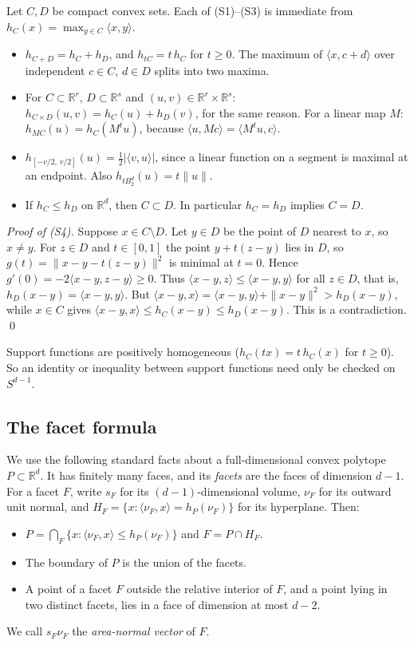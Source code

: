 \documentclass[11pt]{article}
\newcommand{\R}{\mathbb R}
\begin{document}
Let \(C,D\) be compact convex sets. Each of (S1)--(S3) is immediate from
\(h_C(x)=\max_{y\in C}\langle x,y\rangle\).
\begin{itemize}[leftmargin=3em,itemsep=2pt]
\item[(S1)] \(h_{C+D}=h_C+h_D\), and \(h_{tC}=t\,h_C\) for \(t\ge0\).
 The maximum of \(\langle x,c+d\rangle\) over independent \(c\in C\),
 \(d\in D\) splits into two maxima.
\item[(S2)] For \(C\subset\R^r\), \(D\subset\R^s\) and
 \((u,v)\in\R^r\times\R^s\): \(h_{C\times D}(u,v)=h_C(u)+h_D(v)\), for the
 same reason. For a linear map \(M\): \(h_{MC}(u)=h_C(M^tu)\), because
 \(\langle u,Mc\rangle=\langle M^tu,c\rangle\).
\item[(S3)] \(h_{[-v/2,\,v/2]}(u)=\tfrac12|\langle v,u\rangle|\), since a
 linear function on a segment is maximal at an endpoint. Also
 \(h_{tB_2^d}(u)=t\|u\|\).
\item[(S4)] If \(h_C\le h_D\) on \(\R^d\), then \(C\subset D\). In
 particular \(h_C=h_D\) implies \(C=D\).
\end{itemize}
\emph{Proof of (S4).} Suppose \(x\in C\setminus D\). Let \(y\in D\) be the
point of \(D\) nearest to \(x\), so \(x\ne y\). For \(z\in D\) and
\(t\in[0,1]\) the point \(y+t(z-y)\) lies in \(D\), so
\(g(t)=\|x-y-t(z-y)\|^2\) is minimal at \(t=0\). Hence
\(g'(0)=-2\langle x-y,z-y\rangle\ge0\). Thus
\(\langle x-y,z\rangle\le\langle x-y,y\rangle\) for all \(z\in D\), that
is, \(h_D(x-y)=\langle x-y,y\rangle\). But
\(\langle x-y,x\rangle=\langle x-y,y\rangle+\|x-y\|^2>h_D(x-y)\), while
\(x\in C\) gives \(\langle x-y,x\rangle\le h_C(x-y)\le h_D(x-y)\). This is
a contradiction. \qed

\smallskip
Support functions are positively homogeneous (\(h_C(tx)=t\,h_C(x)\) for
\(t\ge0\)). So an identity or inequality between support functions need
only be checked on \(S^{d-1}\).

\subsection{The facet formula}

We use the following standard facts about a full-dimensional convex
polytope \(P\subset\R^d\). It has finitely many faces, and its
\emph{facets} are the faces of dimension \(d-1\). For a facet \(F\), write
\(s_F\) for its \((d-1)\)-dimensional volume, \(\nu_F\) for its outward
unit normal, and \(H_F=\{x:\langle\nu_F,x\rangle=h_P(\nu_F)\}\) for its
hyperplane. Then:
\begin{itemize}[leftmargin=3em,itemsep=2pt]
\item[(P1)] \(P=\bigcap_F\{x:\langle\nu_F,x\rangle\le h_P(\nu_F)\}\) and
 \(F=P\cap H_F\).
\item[(P2)] The boundary of \(P\) is the union of the facets.
\item[(P3)] A point of a facet \(F\) outside the relative interior of
 \(F\), and a point lying in two distinct facets, lies in a face of
 dimension at most \(d-2\).
\end{itemize}
We call \(s_F\nu_F\) the \emph{area-normal vector} of \(F\).
\end{document}
